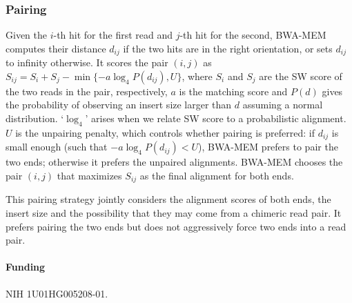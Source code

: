 \documentclass{bioinfo}
\begin{document}
\begin{methods}
\subsubsection{Pairing} Given the $i$-th hit for the first read and $j$-th hit
for the second, BWA-MEM computes their distance $d_{ij}$ if the two hits are in
the right orientation, or sets $d_{ij}$ to infinity otherwise. It scores the
pair $(i,j)$ as $S_{ij}=S_i+S_j-\min\{-a\log_4 P(d_{ij}),U\}$, where $S_i$ and
$S_j$ are the SW score of the two reads in the pair, respectively, $a$ is the
matching score and $P(d)$ gives the probability of observing an insert size
larger than $d$ assuming a normal distribution. `$\log_4$' arises when we
relate SW score to a probabilistic alignment. $U$ is the unpairing penalty,
which controls whether pairing is preferred: if $d_{ij}$ is small enough (such
that $-a\log_4 P(d_{ij})<U$), BWA-MEM prefers to pair the two ends; otherwise
it prefers the unpaired alignments. BWA-MEM chooses the pair $(i,j)$ that
maximizes $S_{ij}$ as the final alignment for both ends.

This pairing strategy jointly considers the alignment scores of both ends,
the insert size and the possibility that they may come from a chimeric read
pair. It prefers pairing the two ends but does not aggressively force two ends
into a read pair.

\end{methods}

\paragraph{Funding\textcolon} NIH 1U01HG005208-01.

\end{document}
